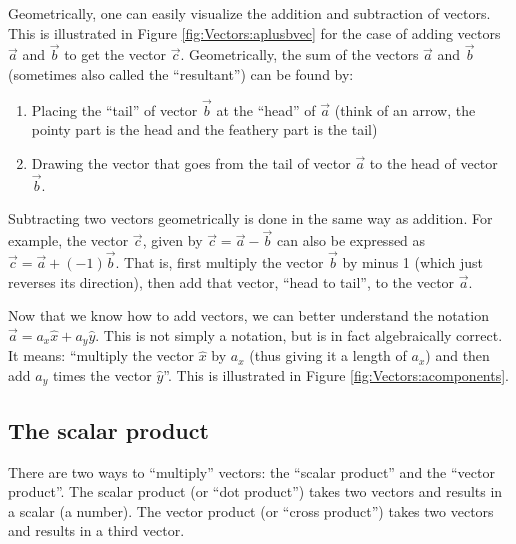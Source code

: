 Geometrically, one can easily visualize the addition and subtraction of vectors. This is illustrated in Figure \ref{fig:Vectors:aplusbvec} for the case of adding vectors $\vec a$ and $\vec b$ to get the vector $\vec c$. Geometrically, the sum of the vectors $\vec a$ and $\vec b$ (sometimes also called the ``resultant'') can be found by:
\begin{enumerate}
\item Placing the ``tail'' of vector $\vec b$ at the ``head'' of $\vec a$ (think of an arrow, the pointy part is the head and the feathery part is the tail)
\item Drawing the vector that goes from the tail of vector $\vec a$ to the head of vector $\vec b$.
\end{enumerate}


Subtracting two vectors geometrically is done in the same way as addition. For example, the vector $\vec c$, given by $\vec c=\vec a -\vec b$ can also be expressed as $\vec c = \vec a + (-1) \vec b$. That is, first multiply the vector $\vec b$ by minus 1 (which just reverses its direction), then add that vector, ``head to tail'', to the vector $\vec a$. 

Now that we know how to add vectors, we can better understand the notation $\vec a = a_x \hat x+ a_y\hat y$. This is not simply a notation, but is in fact algebraically correct. It means: ``multiply the vector $\hat x$ by $a_x$ (thus giving it a length of $a_x$) and then add $a_y$ times the vector $\hat y$''. This is illustrated in Figure \ref{fig:Vectors:acomponents}.



\subsection{The scalar product}
There are two ways to ``multiply'' vectors: the ``scalar product'' and the ``vector product''. The scalar product (or ``dot product'') takes two vectors and results in a scalar (a number). The vector product (or ``cross product'') takes two vectors and results in a third vector. 

